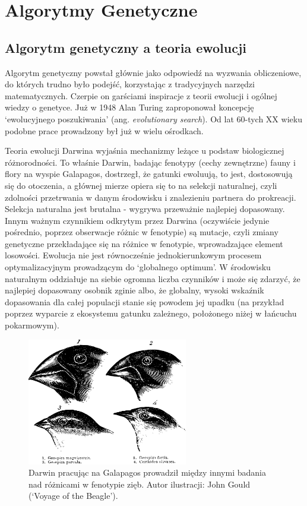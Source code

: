 \documentclass[a4paper,12pt]{article}
\numberwithin{figure}{section}
\begin{document}
    \newpage


    \section{Algorytmy Genetyczne}

    \subsection{Algorytm genetyczny a teoria ewolucji}

    Algorytm genetyczny powstał głównie jako odpowiedź na wyzwania obliczeniowe, do których trudno było podejść, korzystając z tradycyjnych narzędzi matematycznych. Czerpie on garściami inspiracje z teorii ewolucji i ogólnej wiedzy o genetyce. Już w 1948 Alan Turing zaproponował koncepcję `ewolucyjnego poszukiwania' (ang. \textit{evolutionary search}). Od lat 60-tych XX wieku podobne prace prowadzony był już w wielu ośrodkach\cite{IntroductionToEvolutionaryComputing2015}.

    \bigskip

    Teoria ewolucji Darwina wyjaśnia mechanizmy leżące u podstaw biologicznej różnorodności. To właśnie Darwin, badając fenotypy (cechy zewnętrzne) fauny i flory na wyspie Galapagos, dostrzegł, że gatunki ewoluują, to jest, dostosowują się do otoczenia, a głównej mierze opiera się to na selekcji naturalnej, czyli zdolności przetrwania w danym środowisku i znalezieniu partnera do prokreacji. Selekcja naturalna jest brutalna - wygrywa przeważnie najlepiej dopasowany. Innym ważnym czynnikiem odkrytym przez Darwina (oczywiście jedynie pośrednio, poprzez obserwacje różnic w fenotypie) są mutacje, czyli zmiany genetyczne przekładające się na różnice w fenotypie, wprowadzające element losowości. Ewolucja nie jest równocześnie jednokierunkowym procesem optymalizacyjnym prowadzącym do `globalnego optimum'. W środowisku naturalnym oddziałuje na siebie ogromna liczba czynników i może się zdarzyć, że najlepiej dopasowany osobnik zginie albo, że globalny, wysoki wskaźnik dopasowania dla całej populacji stanie się powodem jej upadku (na przykład poprzez wyparcie z ekosystemu gatunku zależnego, położonego niżej w łańcuchu pokarmowym)\cite{IntroductionToEvolutionaryComputing2015}.

    \bigskip

    \begin{figure}[H]
        \centering
        \includegraphics[width=7cm]{darwin_birds}
        \caption{Darwin pracując na Galapagos prowadził między innymi badania nad różnicami w fenotypie zięb. Autor ilustracji: John Gould (`Voyage of the Beagle').}
        \label{fig:darwin_birds}
    \end{figure}
\end{document}

